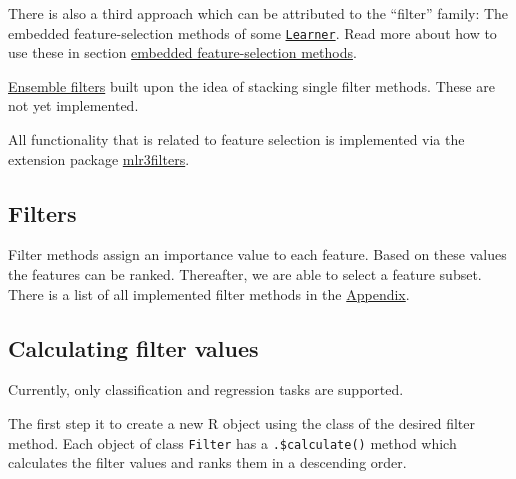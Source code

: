 \documentclass[]{scrbook}
\newenvironment{Shaded}{\begin{snugshade}}{\end{snugshade}}
\newcommand{\KeywordTok}[1]{\textcolor[rgb]{0.13,0.29,0.53}{\textbf{#1}}}
\newcommand{\NormalTok}[1]{#1}
\newcommand{\OperatorTok}[1]{\textcolor[rgb]{0.81,0.36,0.00}{\textbf{#1}}}
\newcommand{\StringTok}[1]{\textcolor[rgb]{0.31,0.60,0.02}{#1}}
\renewenvironment{Shaded} {\begin{snugshade}\small} {\end{snugshade}}
\begin{document}
There is also a third approach which can be attributed to the ``filter'' family:
The embedded feature-selection methods of some \href{https://mlr3.mlr-org.com/reference/Learner.html}{\texttt{Learner}}.
Read more about how to use these in section \protect\hyperlink{fs-embedded}{embedded feature-selection methods}.

\protect\hyperlink{fs-ensemble}{Ensemble filters} built upon the idea of stacking single filter methods.
These are not yet implemented.

All functionality that is related to feature selection is implemented via the extension package \href{https://mlr3filters.mlr-org.com}{mlr3filters}.

\hypertarget{fs-filter}{%
\subsection{Filters}\label{fs-filter}}

Filter methods assign an importance value to each feature.
Based on these values the features can be ranked.
Thereafter, we are able to select a feature subset.
There is a list of all implemented filter methods in the \protect\hyperlink{list-filters}{Appendix}.

\hypertarget{fs-calc}{%
\subsection{Calculating filter values}\label{fs-calc}}

Currently, only classification and regression tasks are supported.

The first step it to create a new R object using the class of the desired filter method.
Each object of class \texttt{Filter} has a \texttt{.\$calculate()} method which calculates the filter values and ranks them in a descending order.

\begin{Shaded}
\end{Shaded}
\end{document}
